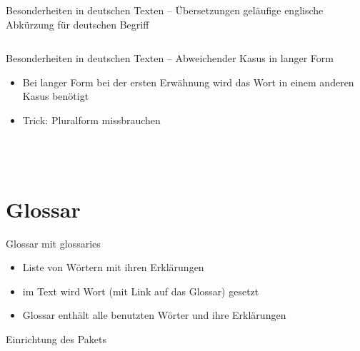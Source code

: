 \documentclass[presentation,aspectratio=169]{beamer}
\begin{document}
\begin{frame}[fragile]{Besonderheiten in deutschen Texten -- Übersetzungen}
  geläufige englische Abkürzung für deutschen Begriff
  \inputminted[firstline=3,lastline=7]{latex}{codebeispiele/acro-used-acronyms.tex}
  
\end{frame}

\begin{frame}[fragile]{Besonderheiten in deutschen Texten -- Abweichender Kasus in langer Form}
  \begin{itemize}
    \item Bei langer Form bei der ersten Erwähnung wird das Wort in einem anderen Kasus benötigt
    \item Trick: Pluralform missbrauchen
  \end{itemize}
  \inputminted[firstline=9,lastline=12]{latex}{codebeispiele/acro-used-acronyms.tex}
  \vspace{2em}
  \begin{columns}
    \begin{column}{.49\textwidth}
      
    \end{column}
    \begin{column}{.5\textwidth}
      \inputminted{latex}{codebeispiele/acro-german-different-case.tex}
    \end{column}
  \end{columns}
\end{frame}

\section{Glossar}

\begin{frame}{Glossar mit glossaries}
  \begin{itemize}
    \item Liste von Wörtern mit ihren Erklärungen
    \item im Text wird Wort (mit Link auf das Glossar) gesetzt
    \item Glossar enthält alle benutzten Wörter und ihre Erklärungen
  \end{itemize}
\end{frame}

\begin{frame}[fragile]{Einrichtung des Pakets}
  \inputminted{latex}{codebeispiele/glossaries-setup.tex}
\end{frame}
\end{document}
